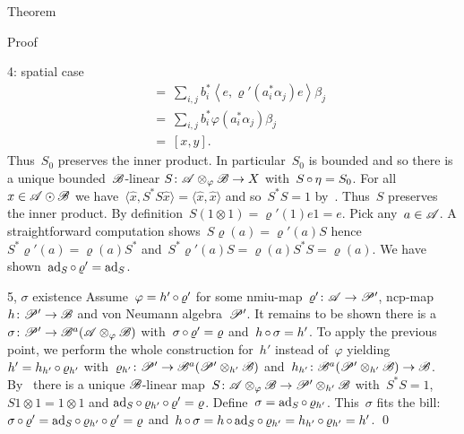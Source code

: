 \documentclass[b]{subfiles}
\begin{document}
\begin{parsec}
\begin{point}{Theorem}
\begin{point}{Proof}
\begin{point}{4: spatial case}
\begin{align*}
    & \ =\ \sum_{i,j} b_i^*\left<e,  \varrho'(a_i^*\alpha_j)e \right>\beta_j \\
    & \ =\ \sum_{i,j} b_i^* \varphi(a_i^*\alpha_j) \beta_j \\
    & \ =\ [x,y].
\end{align*}
Thus~$S_0$ preserves the inner product. In particular~$S_0$ is bounded
    and so there is a unique bounded~$\mathscr{B}$-linear
    $S \colon \mathscr{A} \otimes_\varphi \mathscr{B} \to X$
    with~$S \mathop{\circ} \eta = S_0$.
    For all~$x \in \mathscr{A} \odot \mathscr{B}$
        we have~$\langle \hat{x}, S^*S \hat{x}\rangle = \langle \hat{x}, \hat{x} \rangle$
    and so~$S^*S=1$
    by~.
Thus~$S$ preserves the inner product.
By definition~$S (1\otimes1) = \varrho'(1)e 1 = e$.
Pick any~$a \in \mathscr{A}$.
A straightforward computation shows~$S \varrho(a) = \varrho'(a) S$
hence~$S^* \varrho'(a) = \varrho(a) S^*$
and~$S^* \varrho'(a) S =  \varrho(a) S^*S= \varrho(a)$.
We have shown~$\mathrm{ad}_S \mathop{\circ} \varrho' = \mathrm{ad}_S$.
\end{point}
\begin{point}{5, $\sigma$ existence}
Assume~$\varphi = h' \mathop{\circ} \varrho'$
    for some nmiu-map~$\varrho'\colon \mathscr{A} \to \mathscr{P}'$,
        ncp-map~$h\colon \mathscr{P}' \to \mathscr{B}$
        and von Neumann algebra~$\mathscr{P}'$.
It remains to be shown there is a ~$\sigma\colon \mathscr{P}' \to \mathscr{B}^a(\mathscr{A}\otimes_\varphi\mathscr{B})$
with~$\sigma\mathop{\circ}\varrho'=\varrho$ and~$h \mathop{\circ} \sigma = h'$.
To apply the previous point,
    we perform the whole construction for~$h'$ instead of~$\varphi$
    yielding
    $h' = h_{h'} \mathop{\circ} \varrho_{h'}$
    with~$\varrho_{h'} \colon \mathscr{P}' \to \mathscr{B}^a (\mathscr{P}' \otimes_{h'} \mathscr{B})$
    and~$h_{h'} \colon \mathscr{B}^a(\mathscr{P}' \otimes_{h'} \mathscr{B}) \to \mathscr{B}$.
By~
    there is a unique 
    $\mathscr{B}$-linear map~$S\colon \mathscr{A} \otimes_{\varphi} \mathscr{B} \to
                                \mathscr{P}' \otimes_{h'} \mathscr{B}$
with~$S^*S = 1$, $S 1\otimes1 = 1\otimes1$ and
$\mathrm{ad}_S \mathop{\circ} \varrho_{h'}\mathop{\circ} \varrho' = \varrho$.
Define~$\sigma = \mathrm{ad}_S \mathop{\circ} \varrho_{h'}$.
This~$\sigma$ fits the bill:
$\sigma \mathop{\circ} \varrho' = \mathrm{ad}_S \mathop{\circ} \varrho_{h'} \mathop{\circ} \varrho'
                                = \varrho$
and~$h \mathop{\circ} \sigma = h \mathop{\circ} \mathrm{ad}_S \mathop{\circ} \varrho_{h'}
= h_{h'} \mathop{\circ} \varrho_{h'} = h'$. \qed
\end{point}
\end{point}
\end{point}
\end{parsec}
\end{document}
